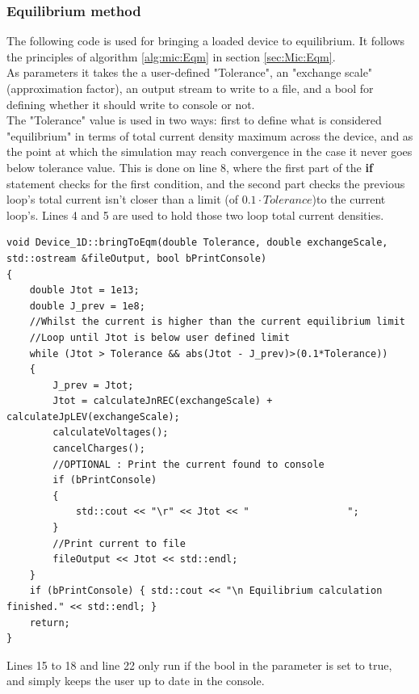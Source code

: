 \documentclass[titlepage]{article}
\begin{document}
\subsubsection{Equilibrium method}
The following code is used for bringing a loaded device to equilibrium. It follows the principles of algorithm \ref{alg:mic:Eqm} in section \ref{sec:Mic:Eqm}. \\
As parameters it takes the a user-defined "Tolerance", an "exchange scale" (approximation factor), an output stream to write to a file, and a bool for defining whether it should write to console or not.\\
The "Tolerance" value is used in two ways: first to define what is considered "equilibrium" in terms of total current density maximum across the device, and as the point at which the simulation may reach convergence in the case it never goes below tolerance value. This is done on line 8, where the first part of the \textbf{if} statement checks for the first condition, and the second part checks the previous loop's total current isn't closer than a limit (of $0.1\cdot Tolerance$)to the current loop's. Lines 4 and 5 are used to hold those two loop total current densities. \\
\begin{lstlisting}
void Device_1D::bringToEqm(double Tolerance, double exchangeScale, 
std::ostream &fileOutput, bool bPrintConsole)
{
	double Jtot = 1e13;
	double J_prev = 1e8;
	//Whilst the current is higher than the current equilibrium limit
	//Loop until Jtot is below user defined limit
	while (Jtot > Tolerance && abs(Jtot - J_prev)>(0.1*Tolerance))
	{
		J_prev = Jtot;	
		Jtot = calculateJnREC(exchangeScale) + calculateJpLEV(exchangeScale);
		calculateVoltages();
		cancelCharges();
		//OPTIONAL : Print the current found to console
		if (bPrintConsole) 
		{	
			std::cout << "\r" << Jtot << "                 ";
		}
		//Print current to file
		fileOutput << Jtot << std::endl;
	}
	if (bPrintConsole) { std::cout << "\n Equilibrium calculation finished." << std::endl; }
	return;
}
\end{lstlisting}
Lines 15 to 18 and line 22 only run if the bool in the parameter is set to true, and simply keeps the user up to date in the console.
\end{document}
